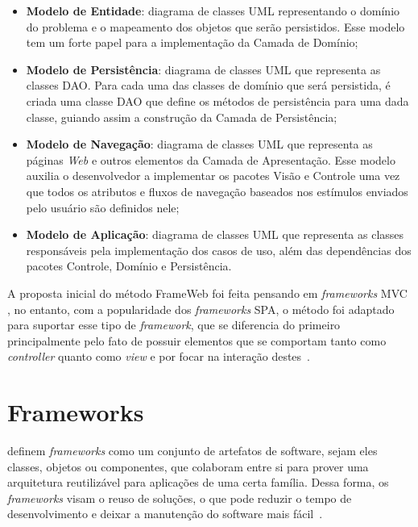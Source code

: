 \begin{itemize}
    \item \textbf{Modelo de Entidade}: diagrama de classes UML representando o domínio do 
        problema e o mapeamento dos objetos que serão persistidos. Esse modelo tem um forte
        papel para a implementação da Camada de Domínio;

    \item \textbf{Modelo de Persistência}: diagrama de classes UML que representa as classes
        DAO. Para cada uma das classes de domínio que será persistida, é criada uma classe DAO
        que define os métodos de persistência para uma dada classe, guiando assim a 
        construção da Camada de Persistência;
    
    \item \textbf{Modelo de Navegação}: diagrama de classes UML que representa as páginas \textit{Web}
        e outros elementos da Camada de Apresentação. Esse modelo auxilia o desenvolvedor a
        implementar os pacotes Visão e Controle uma vez que todos os atributos e fluxos de 
        navegação baseados nos estímulos enviados pelo usuário são definidos nele;

    \item \textbf{Modelo de Aplicação}: diagrama de classes UML que representa as classes
        responsáveis pela implementação dos casos de uso, além das dependências dos pacotes
        Controle, Domínio e Persistência.
\end{itemize}

A proposta inicial do método FrameWeb foi feita pensando em \textit{frameworks} MVC \cite{souza:2007},
no entanto, com a popularidade dos \textit{frameworks} SPA, o método foi adaptado para suportar
esse tipo de \textit{framework}, que se diferencia do primeiro principalmente pelo fato de possuir elementos que se comportam tanto como \textit{controller} quanto como 
\textit{view} e por focar na interação destes~\cite{hoppe:2023}.


\section{Frameworks}
\label{sec-fundteo-framework}

 definem \textit{frameworks} como um conjunto de artefatos de software, sejam eles
classes, objetos ou componentes, que colaboram entre si para prover uma arquitetura reutilizável
para aplicações de uma certa família. Dessa forma, os \textit{frameworks} visam o reuso de soluções, o que
pode reduzir o tempo de desenvolvimento e deixar a manutenção do software mais fácil~\cite{gamma:2000}.

